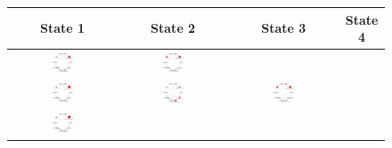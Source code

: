 \begin{figure}
  \centering
  \begin{tabular}{cccc}
    \textbf{State 1} & \textbf{State 2} & \textbf{State 3} & \textbf{State
    4}\\\hline
    \includegraphics[width=0.22\textwidth]{figures/sustain-2state/state0.png}
    &
    \includegraphics[width=0.22\textwidth]{figures/sustain-2state/state1.png}\\
    \includegraphics[width=0.22\textwidth]{figures/sustain-3state/state0.png}
    &
    \includegraphics[width=0.22\textwidth]{figures/sustain-3state/state1.png}
    &
    \includegraphics[width=0.22\textwidth]{figures/sustain-3state/state2.png}\\
    \includegraphics[width=0.22\textwidth]{figures/sustain-4state/state0.png}

\end{tabular}
\end{figure}
